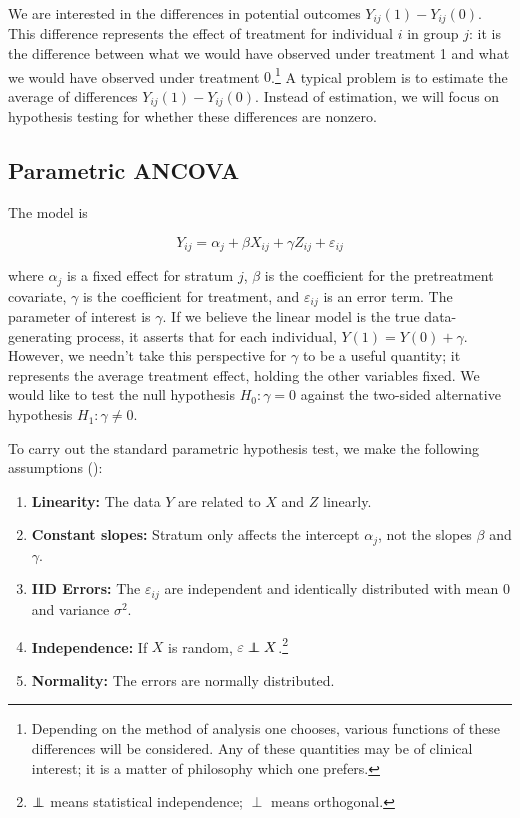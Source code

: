 \documentclass[11pt]{article}
\newcommand{\eps}{\varepsilon}
\newcommand\independent{\protect\mathpalette{\protect\independenT}{\perp}}
\def\independenT#1#2{\mathrel{\rlap{$#1#2$}\mkern2mu{#1#2}}}
\begin{document}
We are interested in the differences in potential outcomes $Y_{ij}(1) - Y_{ij}(0)$.
This difference represents the effect of treatment for individual $i$ in group $j$: it is the difference between what we would have observed under treatment 1 and what we would have observed under treatment $0$.\footnote{
Depending on the method of analysis one chooses, various functions of these differences will be considered.
Any of these quantities may be of clinical interest; it is a matter of philosophy which one prefers.}
A typical problem is to estimate the average of differences $Y_{ij}(1) - Y_{ij}(0)$.
Instead of estimation, we will focus on hypothesis testing for whether these differences are nonzero.

\subsection{Parametric ANCOVA}

The model is

\begin{equation}\label{eqn:ancova}
Y_{ij} = \alpha_j + \beta X_{ij} + \gamma Z_{ij} + \eps_{ij}
\end{equation}

\noindent where $\alpha_j$ is a fixed effect for stratum $j$, $\beta$ is the coefficient for the pretreatment covariate,
$\gamma$ is the coefficient for treatment,
and $\eps_{ij}$ is an error term.
The parameter of interest is $\gamma$. 
If we believe the linear model is the true data-generating process, it asserts that for each individual, $Y(1) = Y(0) + \gamma$.
However, we needn't take this perspective for $\gamma$ to be a useful quantity; it represents the average treatment effect, holding the other variables fixed.
We would like to test the null hypothesis $H_0: \gamma = 0$ against
the two-sided alternative hypothesis $H_1: \gamma \neq 0$.

To carry out the standard parametric hypothesis test, we make the following assumptions (\cite{freedman_statistical_2005}):

\begin{enumerate}
\item \textbf{Linearity:} The data $Y$ are related to $X$ and $Z$ linearly.
\item \textbf{Constant slopes:} Stratum only affects the intercept $\alpha_j$, not the slopes $\beta$ and $\gamma$.
\item \textbf{IID Errors:} The $\eps_{ij}$ are independent and identically distributed with mean $0$ and variance $\sigma^2$.
\item \textbf{Independence:} If $X$ is random, $\eps \independent X$.\footnote{$\independent$ means statistical independence; $\perp$ means orthogonal.}
\item \textbf{Normality:} The errors are normally distributed.
\end{enumerate}
\end{document}
